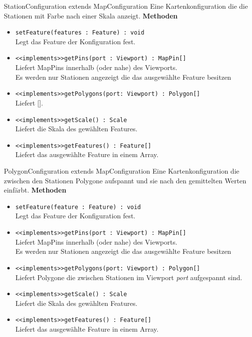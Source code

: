     \begin{Class}{StationConfiguration extends MapConfiguration}
        Eine Kartenkonfiguration die die Stationen mit Farbe nach einer Skala anzeigt.
        \textbf{Methoden}
        \begin{itemize}
            \item \texttt{setFeature(features : Feature) : void}
            \\ Legt das Feature der Konfiguration fest.
            \item \texttt{<<implements>>getPins(port : Viewport) : MapPin[]}
            \\ Liefert MapPins innerhalb (oder nahe) des Viewports.
            \\ Es werden nur Stationen angezeigt die das ausgewählte Feature besitzen
            \item \texttt{<<implements>>getPolygons(port: Viewport) : Polygon[]}
            \\ Liefert [].
            \item \texttt{<<implements>>getScale() : Scale}
            \\ Liefert die Skala des gewählten Features.
            \item \texttt{<<implements>>getFeatures() : Feature[]}
            \\ Liefert das ausgewählte Feature in einem Array.
        \end{itemize}
    \end{Class}

    \begin{Class}{PolygonConfiguration extends MapConfiguration}
        Eine Kartenkonfiguration die zwischen den Stationen Polygone aufspannt und sie nach den gemittelten Werten einfärbt.
        \textbf{Methoden}
        \begin{itemize}
            \item \texttt{setFeature(feature : Feature) : void}
            \\ Legt das Feature der Konfiguration fest.
            \item \texttt{<<implements>>getPins(port : Viewport) : MapPin[]}
            \\ Liefert MapPins innerhalb (oder nahe) des Viewports.
            \\ Es werden nur Stationen angezeigt die das ausgewählte Feature besitzen
            \item \texttt{<<implements>>getPolygons(port: Viewport) : Polygon[]}
            \\ Liefert Polygone die zwischen Stationen im Viewport \emph{port} aufgespannt sind.
            \item \texttt{<<implements>>getScale() : Scale}
            \\ Liefert die Skala des gewählten Features.
            \item \texttt{<<implements>>getFeatures() : Feature[]}
            \\ Liefert das ausgewählte Feature in einem Array.
        \end{itemize}
    \end{Class}

